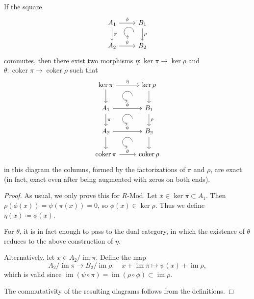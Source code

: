 \documentclass[english,letterpaper]{article}%
\numberwithin{equation}{section}
\numberwithin{figure}{section}
\numberwithin{table}{section}
\theoremstyle{definition}
\theoremstyle{definition}
\theoremstyle{definition}
\theoremstyle{plain}
\theoremstyle{plain}
\theoremstyle{plain}
\theoremstyle{plain}
\theoremstyle{remark}
\theoremstyle{remark}
\DeclareMathOperator{\im}{im}
\DeclareMathOperator{\coker}{coker}
\begin{document}
\begin{lem}
    If the square 
    \[\begin{tikzcd}[every matrix/.append style={name=m},   
        execute at end picture={\draw [<-] ([xshift=-7mm,yshift=-10mm]m-1-2.north) arc[start angle=-90,delta angle=-270,radius=0.25cm];}]
        A_1 \arrow[r,"\phi"]\arrow[d,"\pi"] & B_1\arrow[d,"\rho"] \\
        A_2\arrow[r,"\psi"] &B_2 
    \end{tikzcd}\]
    commutes, then there exist two morphisms $\eta:\ker\pi\to\ker\rho $ and $\theta:\coker\pi\to\coker\rho$ such that
    \[\begin{tikzcd}[every matrix/.append style={name=m},   
        execute at end picture={\draw [<-] ([xshift=-11mm,yshift=1mm]m-2-2.north) arc[start angle=-90,delta angle=-270,radius=0.25cm];
        \draw [<-] ([xshift=-11mm,yshift=1mm]m-3-2.north) arc[start angle=-90,delta angle=-270,radius=0.25cm];
        \draw [<-] ([xshift=-11mm,yshift=1mm]m-4-2.north) arc[start angle=-90,delta angle=-270,radius=0.25cm];}]
        \ker\pi \arrow[r,"\eta"]\arrow[d] & \ker\rho \arrow[d] \\
        A_1\arrow[r,"\phi"]\arrow[d,"\pi"] &B_1\arrow[d,"\rho"]\\
        A_2\arrow[r,"\psi"]\arrow[d] &B_2\arrow[d]\\
        \coker\pi \arrow[r,"\theta"] & \coker\rho
    \end{tikzcd}\]
    in this diagram the columns, formed by the factorizations of $\pi$ and $\rho$, are exact (in fact, exact even after being augmented with zeros on both ends).
\end{lem}
\begin{proof}
    As usual, we only prove this for $R\text{-}\mathrm{Mod}$. Let $x\in \ker\pi\subset A_1$. Then $\rho(\phi(x))=\psi(\pi(x))=0$, so $\phi(x)\in\ker\rho$. Thus we define $\eta(x)\coloneqq\phi(x)$.
    
    For $\theta$, it is in fact enough to pass to the dual category, in which the existence of $\theta$ reduces to the above construction of $\eta$.
    
    Alternatively, let $x\in A_2/\im\pi$. Define the map \[A_2/\im\pi\to B_2/\im\rho,\quad x+\im\pi\mapsto \psi(x)+\im\rho,\]
    which is valid since $\im(\psi\circ\pi)=\im(\rho\circ\phi)\subset \im\rho$. 
    
    The commutativity of the resulting diagrams follows from the definitions.
\end{proof}
\end{document}
